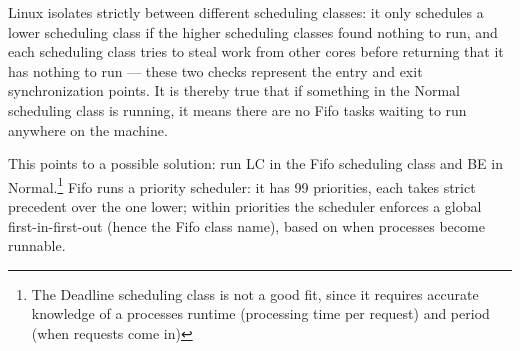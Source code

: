 Linux isolates strictly between different scheduling classes: it only schedules
a lower scheduling class if the higher scheduling classes found nothing to run,
and each scheduling class tries to steal work from other cores before returning
that it has nothing to run --- these two checks represent the entry and exit
synchronization points. It is thereby true that if something in the Normal
scheduling class is running, it means there are no Fifo tasks waiting to run
anywhere on the machine.

This points to a possible solution: run LC in the Fifo scheduling class and BE
in Normal.\footnote{The Deadline scheduling class is not a good fit, since it
requires accurate knowledge of a processes runtime (processing time per request)
and period (when requests come in)} Fifo runs a priority scheduler: it has 99
priorities, each takes strict precedent over the one lower; within priorities
the scheduler enforces a global first-in-first-out (hence the Fifo class name),
based on when processes become runnable.

